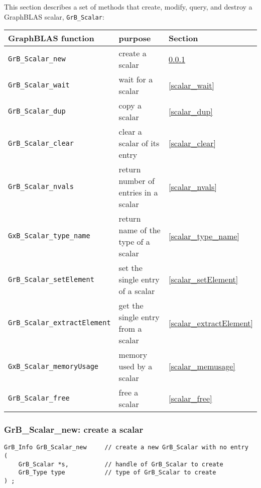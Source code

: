 \documentclass[12pt]{article}
\begin{document}
This section describes a set of methods that create, modify, query,
and destroy a GraphBLAS scalar, \verb'GrB_Scalar':

\vspace{0.2in}
{\footnotesize
\begin{tabular}{lll}
GraphBLAS function   & purpose                                      & Section \\
\hline
\verb'GrB_Scalar_new'            & create a scalar                      & \ref{scalar_new} \\
\verb'GrB_Scalar_wait'           & wait for a scalar                    & \ref{scalar_wait} \\
\verb'GrB_Scalar_dup'            & copy a scalar                        & \ref{scalar_dup} \\
\verb'GrB_Scalar_clear'          & clear a scalar of its entry          & \ref{scalar_clear} \\
\verb'GrB_Scalar_nvals'          & return number of entries in a scalar & \ref{scalar_nvals}  \\
\verb'GxB_Scalar_type_name'      & return name of the type of a scalar  & \ref{scalar_type_name} \\
\verb'GrB_Scalar_setElement'     & set the single entry of a scalar     & \ref{scalar_setElement} \\
\verb'GrB_Scalar_extractElement' & get the single entry from a scalar   & \ref{scalar_extractElement} \\
\verb'GxB_Scalar_memoryUsage'    & memory used by a scalar              & \ref{scalar_memusage} \\
\verb'GrB_Scalar_free'           & free a scalar                        & \ref{scalar_free} \\
\hline
\end{tabular}
}

\subsubsection{{\sf GrB\_Scalar\_new:} create a scalar}
\label{scalar_new}

\begin{mdframed}[userdefinedwidth=6in]
{\footnotesize
\begin{verbatim}
GrB_Info GrB_Scalar_new     // create a new GrB_Scalar with no entry
(
    GrB_Scalar *s,          // handle of GrB_Scalar to create
    GrB_Type type           // type of GrB_Scalar to create
) ;
\end{verbatim}
} \end{mdframed}
\end{document}
